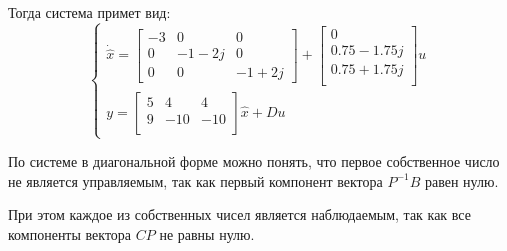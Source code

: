 Тогда система примет вид: 
\begin{equation}
    \begin{cases}
        \dot{\hat{x}} = \begin{bmatrix}
            -3 & 0 & 0 \\
            0 & -1-2j & 0 \\
            0 & 0 & -1+2j
        \end{bmatrix} + \begin{bmatrix}
            0 \\
            0.75-1.75j \\
            0.75+1.75j \\
        \end{bmatrix} u \\ 
        y = \begin{bmatrix}
            5 & 4 & 4 \\
            9 & -10 & -10 \\
        \end{bmatrix} \hat{x} + Du 
    \end{cases}
    \label{eq:task4_diag}
\end{equation}

По системе в диагональной форме можно понять, что первое собственное число 
не является управляемым, так как первый компонент вектора $P^{-1}B$ равен нулю. 

При этом каждое из собственных чисел является наблюдаемым, так как все компоненты вектора $CP$ не равны нулю. 

